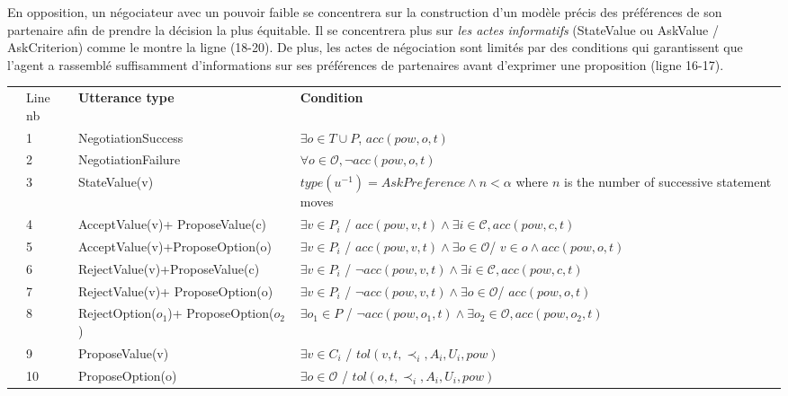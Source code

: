 		En opposition, un négociateur avec un pouvoir faible se concentrera sur la construction d'un modèle précis des préférences de son partenaire afin de prendre la décision la plus équitable. Il se concentrera plus sur \emph {les actes informatifs} (StateValue ou AskValue / AskCriterion) comme le montre la ligne (18-20). De plus, les actes de négociation sont limités par des conditions qui garantissent que l'agent a rassemblé suffisamment d'informations sur ses préférences de partenaires avant d'exprimer une proposition (ligne 16-17).
			\begin{table*}[!t]
				{%
					\centering
					\begin{tabular}{|p{.3cm}|p{.6cm}|p{3cm}|p{7.5cm}|}
						\hline
						\parbox[t]{2mm}{}&Line nb& \textbf{Utterance type} & \textbf{Condition} \\
						&1&NegotiationSuccess & $\exists o \in T\cup P$, $acc(pow,o,t)$ \\
						& 2& NegotiationFailure & $ \forall o \in \mathcal{O},  \neg acc(pow,o,t)$\\
						&3& StateValue(v) & $type(u^{-1}) = AskPreference \land n < \alpha$ \newline where $n$ is the number of successive statement moves\\
						&4& AcceptValue(v)+ \newline ProposeValue(c) & $ \exists v \in P_i$ / $acc(pow,v,t) \land \exists i\in\mathcal{C}, acc(pow,c,t)$ \\
						&5& AcceptValue(v)+\newline ProposeOption(o) &  $ \exists v \in P_i$ / $ acc(pow,v,t) \land \exists o \in \mathcal{O}$/ $ v \in o \land acc(pow,o,t)$ \\
						&6& RejectValue(v)+\newline ProposeValue(c) & $ \exists v \in P_i$ / $ \neg acc(pow,v,t) \land \exists i\in\mathcal{C}, acc(pow,c,t)$ \\
						&7& RejectValue(v)+ \newline ProposeOption(o) &  $ \exists v \in P_i$ / $  \neg acc(pow,v,t) \land \exists o \in \mathcal{O}$/ $acc(pow,o,t)$ \\
						& 8&RejectOption($o_1$)+ ProposeOption($o_2$) & $ \exists o_1 \in P$ / $ \neg acc(pow,o_1,t) \land \exists o_2\in\mathcal{O}, acc(pow,o_2,t)$ \\
						&9& ProposeValue(v) & $\exists v \in C_i$ / $tol(v, t, \prec_i, A_i, U_i, pow)$\\
						&10& ProposeOption(o) & $\exists o \in \mathcal{O}$ / $tol(o, t, \prec_i, A_i, U_i, pow)$\\
						

\end{tabular}}
\end{table*}
